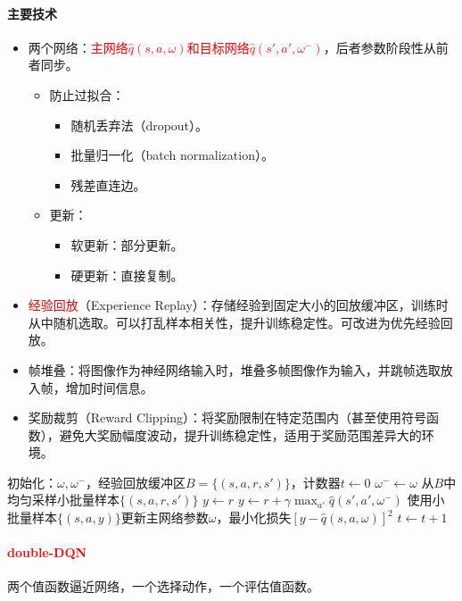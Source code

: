 \documentclass[
12pt, %
a4paper, 
oneside, %
]{scrartcl}
\begin{document}
\paragraph{主要技术}
\begin{itemize}
\item 两个网络：\textcolor{red}{主网络$ \hat{q}(s, a, \omega) $和目标网络$ \hat{q}(s', a', \omega^-) $}，后者参数阶段性从前者同步。
\begin{itemize}
\item 防止过拟合：
\begin{itemize}
\item 随机丢弃法（dropout）。
\item 批量归一化（batch normalization）。
\item 残差直连边。
\end{itemize}
\item 更新：
\begin{itemize}
\item 软更新：部分更新。
\item 硬更新：直接复制。
\end{itemize}
\end{itemize}
\item \textcolor{red}{经验回放}（Experience Replay）：存储经验到固定大小的回放缓冲区，训练时从中随机选取。可以打乱样本相关性，提升训练稳定性。可改进为优先经验回放。
\item 帧堆叠：将图像作为神经网络输入时，堆叠多帧图像作为输入，并跳帧选取放入帧，增加时间信息。
\item 奖励裁剪（Reward Clipping）：将奖励限制在特定范围内（甚至使用符号函数），避免大奖励幅度波动，提升训练稳定性，适用于奖励范围差异大的环境。
\end{itemize}
\begin{myalgorithm}[DQN]
\State 初始化：$ \omega, \omega^- $，经验回放缓冲区$ B = \{(s, a, r, s')\} $，计数器$ t \gets 0 $
\Loop
{} 
\State $ \omega^- \gets \omega $
\EndIf
\State 从$ B $中均匀采样小批量样本$ \{(s, a, r, s')\} $
\State $ y \gets r $
\Else
\State $ y \gets r + \gamma \max_{a'} \hat{q}(s', a', \omega^-) $ 
\EndIf
\EndFor
\State 使用小批量样本$ \{(s, a, y)\} $更新主网络参数$ \omega $，最小化损失$ [y - \hat{q}(s, a, \omega)]^2 $
\State $ t \gets t + 1 $
\EndLoop
\end{myalgorithm}
\paragraph{\textcolor{red}{double-DQN}}
两个值函数逼近网络，一个选择动作，一个评估值函数。
\end{document}
